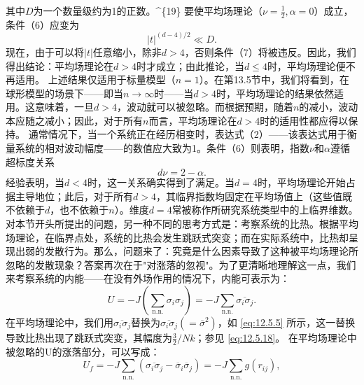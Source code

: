 其中\(D\)为一个数量级约为1的正数。\^{}\{19\} 要使平均场理论（\(\nu=\frac{1}{2},\alpha=0\)）成立，条件（6）应变为
\begin{equation}\tag{12.13.7}\label{eq:12.13.7}
| t | ^{( d - 4 ) / 2} \ll D .
\end{equation}
现在，由于可以将\(|t|\)任意缩小，除非\(d > 4\)，否则条件（7）将被违反。因此，我们得出结论：平均场理论在\(d > 4\)时才成立；由此推论，当\(d \leq 4\)时，平均场理论便不再适用。
上述结果仅适用于标量模型（\(n=1\)）。在第13.5节中，我们将看到，在球形模型的场景下——即当\(n\to\infty\)时——当\(d>4\)时，平均场理论的结果依然适用。这意味着，一旦\(d>4\)，波动就可以被忽略。而根据预期，随着\(n\)的减小，波动本应随之减小；因此，对于所有\(n\)而言，平均场理论在\(d>4\)时的适用性都应得以保持。
通常情况下，当一个系统正在经历相变时，表达式（2）——该表达式用于衡量系统的相对波动幅度——的数值应大致为1。条件（6）则表明，指数\(\nu\)和\(\alpha\)遵循超标度关系
\begin{equation}\tag{12.13.8}\label{eq:12.13.8}
d \nu = 2 - \alpha .
\end{equation}
经验表明，当\(d<4\)时，这一关系确实得到了满足。当\(d=4\)时，平均场理论开始占据主导地位；此后，对于所有\(d>4\)，其临界指数均固定在平均场值上（这些值既不依赖于\(d\)，也不依赖于\(n\)）。维度\(d=4\)常被称作所研究系统类型中的上临界维数。
对本节开头所提出的问题，另一种不同的思考方式是：考察系统的比热。根据平均场理论，在临界点处，系统的比热会发生跳跃式突变；而在实际系统中，比热却呈现出弱的发散行为。那么，问题来了：究竟是什么因素导致了这种被平均场理论所忽略的发散现象？答案再次在于"对涨落的忽视"。为了更清晰地理解这一点，我们来考察系统的内能——在没有外场作用的情况下，内能可表示为：
\begin{equation}\tag{12.13.9}\label{eq:12.13.9}
U = - J \left( \sum _ { \mathrm { n . n . } } \sigma _ { i } \sigma _ { j } \right) = - J \sum _ { \mathrm { n . n . } } \overline { { \sigma _ { i } \sigma _ { j } } } .
\end{equation}
在平均场理论中，我们用\(\overline{\sigma_{i}\sigma_{j}}\)替换为\(\overline{\sigma_{i}\sigma_{j}}(=\overline{\sigma}^{2})\)，如 \autoref{eq:12.5.5} 所示，这一替换导致比热出现了跳跃式突变，其幅度为\(\frac{3}{2}/Nk\)；参见 \autoref{eq:12.5.18}。
在平均场理论中被忽略的U的涨落部分，可以写成：
\begin{equation}\tag{12.13.10}\label{eq:12.13.10}
U _ { f } = - J \sum _ { \mathrm { n . n . } } ( \overline { { \sigma _ { i } \sigma _ { j } } } - \overline { { \sigma } } _ { i } \overline { { \sigma } } _ { j } ) = - J \sum _ { \mathrm { n . n . } } g ( r _ { i j } ) ,
\end{equation}
